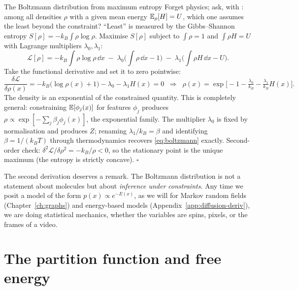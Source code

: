 \begin{toolbox}[tb:maxent]{The Boltzmann distribution from maximum entropy}
Forget physics; ask, with \citet{jaynes1957information}: among all
densities $\rho$ with a given mean energy $\mathbb{E}_\rho[H] = U$, which one
assumes the least beyond the constraint? ``Least'' is measured by the
Gibbs--Shannon entropy $S[\rho] = -k_B \int \rho \log \rho$. Maximise
$S[\rho]$ subject to $\int \rho = 1$ and $\int \rho H = U$ with Lagrange
multipliers $\lambda_0, \lambda_1$:
\begin{equation*}
  \mathcal{L}[\rho]
  = -k_B \!\int\! \rho \log \rho \,\dd x
  \;-\; \lambda_0 \Big( \!\int\! \rho \,\dd x - 1 \Big)
  \;-\; \lambda_1 \Big( \!\int\! \rho H \,\dd x - U \Big).
\end{equation*}
Take the functional derivative and set it to zero pointwise:
\begin{equation*}
  \frac{\delta \mathcal{L}}{\delta \rho(x)}
  = -k_B\big(\log \rho(x) + 1\big) - \lambda_0 - \lambda_1 H(x) = 0
  \;\;\Longrightarrow\;\;
  \rho(x) = \exp\!\Big[-1 - \tfrac{\lambda_0}{k_B} - \tfrac{\lambda_1}{k_B} H(x)\Big].
\end{equation*}
The density is an exponential of the constrained quantity. This is
completely general: constraining $\mathbb{E}[\phi_j(x)]$ for features $\phi_j$
produces $\rho \propto \exp[-\sum_j \beta_j \phi_j(x)]$, the exponential
family. The multiplier $\lambda_0$ is fixed by normalisation and produces
$Z$; renaming $\lambda_1/k_B = \beta$ and identifying $\beta = 1/(k_B T)$
through thermodynamics recovers \eqref{eq:boltzmann} exactly.
Second-order check:
$\delta^2 \mathcal{L} / \delta \rho^2 = -k_B/\rho < 0$, so the stationary
point is the unique maximum (the entropy is strictly concave).
\hfill$\square$
\end{toolbox}

The second derivation deserves a remark. The Boltzmann distribution is
not a statement about molecules but about \emph{inference under
constraints}. Any time we posit a model of the form
$p(x) \propto e^{-E(x)}$, as we will for Markov random fields
(Chapter~\ref{ch:graphs}) and energy-based models
(Appendix~\ref{app:diffusion-deriv}), we are doing statistical mechanics, whether the
variables are spins, pixels, or the frames of a video.

\section{The partition function and free energy}\label{sec:free-energy}

